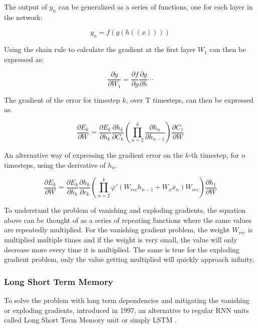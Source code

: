 \documentclass[../main.tex]{subfiles}
\begin{document}
The output of $y_n$ can be generalized as a series of functions, one for each layer in the network:

$$y_n = f \left( g \left( h \left( \left(x\right) \right) \right) \right)$$

Using the chain rule to calculate the gradient at the first layer $W_1$ can then be expressed as:

$$\frac{\partial y}{\partial W_1} = 
\frac{\partial f}{\partial g}\frac{\partial g}{\partial h} \cdots$$

The gradient of the error for timestep $k$, over T timesteps, can then be expressed as.

\begin{equation}\label{eq:gradienterr}
\frac{\partial E_k}{\partial W} = \frac{\partial E_k}{\partial h_k}\frac{\partial h_k}{\partial C_k}\left( \prod_{n=2}^k  \frac{\partial h_n}{\partial h_{n-1}} \right) \frac{\partial C_1}{\partial W}
\end{equation}

An alternative way of expressing the gradient error on the $k$-th timestep, for $n$ timesteps, using the derivative of $h_n$.

$$\frac{\partial E_k}{\partial W} = \frac{\partial E_k}{\partial h_k}\frac{\partial h_k}{\partial c_k}\left( \prod_{n=2}^k \varphi'\left(W_{rec} h_{n-1} + W_x x_n \right) W_{rec}\right) \frac{\partial h_1}{\partial W}$$

To understand the problem of vanishing and exploding gradients, the equation above can be thought of as a series of repeating functions where the same values are repeatedly multiplied. For the vanishing gradient problem, the weight $W_{rec}$ is multiplied multiple times and if the weight is very small, the value will only decrease more every time it is multiplied. The same is true for the exploding gradient problem, only the value getting multiplied will quickly approach infinity.

\subsubsection{Long Short Term Memory}
\label{sec:lstm}
To solve the problem with long term dependencies and mitigating the vanishing or exploding gradients, \citeauthor{hochreiter_schmidhuber_1997} introduced in 1997, an alternative to regular RNN units called Long Short Term Memory unit or simply LSTM \cite{hochreiter_schmidhuber_1997}.
\end{document}
